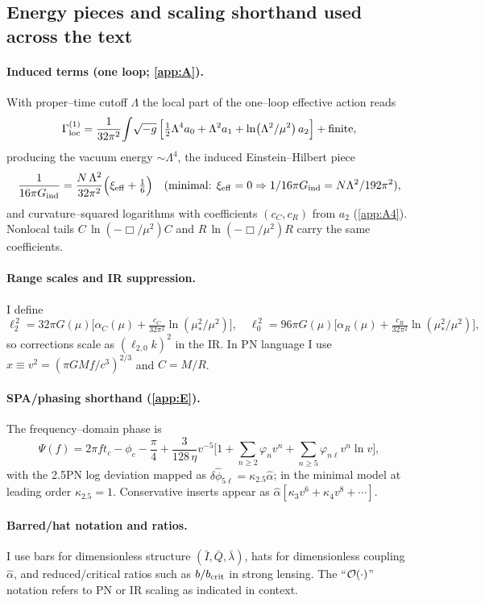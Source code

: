 \documentclass{iopjournal}
\begin{document}
\subsection{Energy pieces and scaling shorthand used across the text}\label{app:M5}
\paragraph{Induced terms (one loop; \cref{app:A}).}
With proper–time cutoff $\Lambda$ the local part of the one–loop effective action reads
\[
\Gamma^{(1)}_{\rm loc}=\frac{1}{32\pi^2}\!\int\!\sqrt{-g}\,\Big[\tfrac12\Lambda^4 a_0+\Lambda^2 a_1+\ln(\Lambda^2/\mu^2)\,a_2\Big]+\text{finite},
\]
producing the vacuum energy $\sim \Lambda^4$, the induced Einstein–Hilbert piece
\[
\frac{1}{16\pi G_{\rm ind}}=\frac{N\,\Lambda^2}{32\pi^2}\Big(\xi_{\rm eff}+\tfrac16\Big)\quad(\text{minimal: }\xi_{\rm eff}=0\Rightarrow 1/16\pi G_{\rm ind}=N\Lambda^2/192\pi^2),
\]
and curvature–squared logarithms with coefficients $(c_C,c_R)$ from $a_2$ (\cref{app:A4}). Nonlocal tails $C\,\ln(-\Box/\mu^2)C$ and $R\,\ln(-\Box/\mu^2)R$ carry the same coefficients.

\paragraph{Range scales and IR suppression.}
I define
\begin{equation}
\ell_2^{\,2}=32\pi G(\mu)\Big[\alpha_C(\mu)+\tfrac{c_C}{32\pi^2}\ln(\mu_*^2/\mu^2)\Big],\quad
\ell_0^{\,2}=96\pi G(\mu)\Big[\alpha_R(\mu)+\tfrac{c_R}{32\pi^2}\ln(\mu_*^2/\mu^2)\Big],
\label{eq:M_ranges}
\end{equation}
so corrections scale as $(\ell_{2,0}k)^2$ in the IR. In PN language I use $x\equiv v^{2}=(\pi GM f/c^{3})^{2/3}$ and $C=M/R$.

\paragraph{SPA/phasing shorthand (\cref{app:E}).}
The frequency–domain phase is
\[
\Psi(f)=2\pi f t_c-\phi_c-\frac{\pi}{4}+\frac{3}{128\,\eta}v^{-5}\Big[1+\sum_{n\ge2}\varphi_n v^n+\sum_{n\ge5}\varphi_{n\ell} v^{n}\ln v\Big],
\]
with the 2.5PN log deviation mapped as $\delta\hat\phi_{5\ell}=\kappa_{2.5}\widehat\alpha$; in the minimal model at leading order $\kappa_{2.5}=1$. Conservative inserts appear as $\widehat\alpha[\kappa_3 v^6+\kappa_4 v^8+\cdots]$.

\paragraph{Barred/hat notation and ratios.}
I use bars for dimensionless structure $(\bar{I},\bar{Q},\bar\lambda)$, hats for dimensionless coupling $\widehat\alpha$, and reduced/critical ratios such as $b/b_{\rm crit}$ in strong lensing. The ``$\order{\cdot}$'' notation refers to PN or IR scaling as indicated in context.
\end{document}
